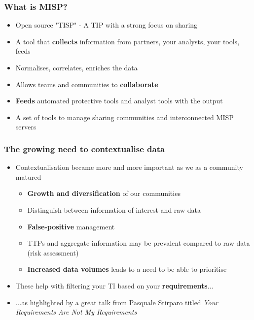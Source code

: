 
\begin{frame}
\titlepage
\end{frame}

\begin{frame}
\frametitle{What is MISP?}
\begin{itemize}
       \item Open source "TISP" - A TIP with a strong focus on sharing
       \item A tool that {\bf collects} information from partners, your analysts, your tools, feeds
       \item Normalises, correlates, enriches the data
       \item Allows teams and communities to {\bf collaborate}
       \item {\bf Feeds} automated protective tools and analyst tools with the output
       \item A set of tools to manage sharing communities and interconnected MISP servers
\end{itemize}
\end{frame}

\begin{frame}
\frametitle{The growing need to contextualise data}
\begin{itemize}
       \item Contextualisation became more and more important as we as a community matured
        \begin{itemize}
                \item {\bf Growth and diversification} of our communities
                \item Distinguish between information of interest and raw data
                \item {\bf False-positive} management
                \item TTPs and aggregate information may be prevalent compared to raw data (risk assessment)
                \item {\bf Increased data volumes} leads to a need to be able to prioritise
	\end{itemize}
	\item These help with filtering your TI based on your {\bf requirements}...
	\item ...as highlighted by a great talk from Pasquale Stirparo titled \textit{Your Requirements Are Not My Requirements}
\end{itemize}
\end{frame}

